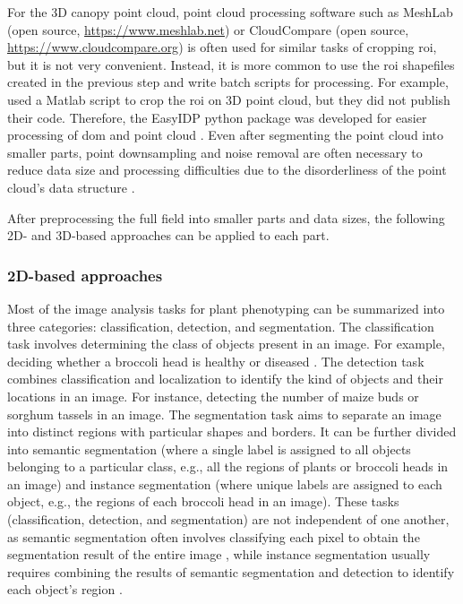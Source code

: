 For the 3D canopy point cloud, point cloud processing software such as MeshLab (open source, \url{https://www.meshlab.net}) or CloudCompare (open source, \url{https://www.cloudcompare.org}) is often used for similar tasks of cropping \gls{roi}, but it is not very convenient. Instead, it is more common to use the \gls{roi} shapefiles created in the previous step and write batch scripts for processing. For example, \citet{sun_field_2018} used a Matlab script to crop the \gls{roi} on 3D point cloud, but they did not publish their code. Therefore, the EasyIDP python package was developed for easier processing of \gls{dom} and point cloud \citep{wang_easyidp_2021}. Even after segmenting the point cloud into smaller parts, point downsampling and noise removal are often necessary to reduce data size and processing difficulties due to the disorderliness of the point cloud's data structure \citep{ma_calculation_2019}.

After preprocessing the full field into smaller parts and data sizes, the following 2D- and 3D-based approaches can be applied to each part.

\subsubsection{2D-based approaches}

Most of the image analysis tasks for plant phenotyping can be summarized into three categories: classification, detection, and segmentation. The classification task involves determining the class of objects present in an image. For example, deciding whether a broccoli head is healthy or diseased \citep{garcia_towards_2021}. The detection task combines classification and localization to identify the kind of objects and their locations in an image. For instance, detecting the number of maize buds \citep{liu_estimating_2022} or sorghum tassels \citep{ghosal_weakly_2019} in an image. The segmentation task aims to separate an image into distinct regions with particular shapes and borders. It can be further divided into semantic segmentation (where a single label is assigned to all objects belonging to a particular class, e.g., all the regions of plants or broccoli heads in an image) and instance segmentation (where unique labels are assigned to each object, e.g., the regions of each broccoli head in an image). These tasks (classification, detection, and segmentation) are not independent of one another, as semantic segmentation often involves classifying each pixel to obtain the segmentation result of the entire image \citep{guo_easypcc_2017}, while instance segmentation usually requires combining the results of semantic segmentation and detection to identify each object's region \citep[see Fig.~2]{luling_using_2021}.


